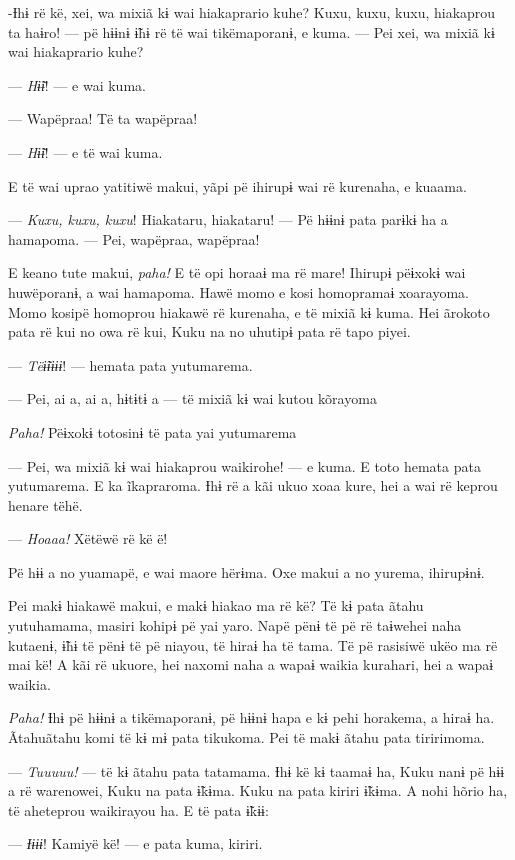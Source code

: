 -Ɨhɨ rë kë, xei, wa mixiã kɨ wai hiakaprario kuhe? Kuxu, kuxu, kuxu,
hiakaprou ta haɨro! --- pë hɨɨnɨ ɨ̃hɨ rë të wai tikëmaporanɨ, e kuma. ---
Pei xei, wa mixiã kɨ wai hiakaprario kuhe?

--- \textit{Hɨ̃ɨ}! --- e wai kuma. 

--- Wapëpraa! Të ta wapëpraa! 

--- \textit{Hɨ̃ɨ}! --- e të wai kuma. 

E të wai uprao yatitiwë makui, yãpi pë ihirupɨ wai rë kurenaha, e
kuaama. 

--- \textit{Kuxu, kuxu, kuxu}! Hiakataru, hiakataru! --- Pë hɨɨnɨ pata parɨkɨ ha a
hamapoma. --- Pei, wapëpraa, wapëpraa! 

E keano tute makui, \textit{paha!} E të opi horaaɨ ma rë mare! Ihirupɨ pëɨxokɨ
wai huwëporanɨ, a wai hamapoma. Hawë momo e kosi homopramaɨ xoarayoma.
Momo kosipë homoprou hiakawë rë kurenaha, e të mixiã kɨ kuma. Hei
ãrokoto pata rë kui no owa rë kui, Kuku na no uhutipɨ pata rë tapo
piyei. 

--- \textit{Tëɨ̃ɨɨɨɨ}! --- hemata pata yutumarema. 

--- Pei, ai a, ai a, hɨtɨtɨ a --- të mixiã kɨ wai kutou kõrayoma 

\textit{Paha!} Pëɨxokɨ totosinɨ të pata yai yutumarema 

--- Pei, wa mixiã kɨ wai hiakaprou waikirohe! --- e kuma. E toto hemata
pata yutumarema. E ka ĩkapraroma. Ɨhɨ rë a kãi ukuo xoaa kure, hei a wai
rë keprou henare tëhë. 

--- \textit{Hoaaa!} Xëtëwë rë kë ë! 

Pë hɨɨ a no yuamapë, e wai maore hërɨma. Oxe makui a no yurema,
ihirupɨnɨ. 

Pei makɨ hiakawë makui, e makɨ hiakao ma rë kë? Të kɨ pata ãtahu
yutuhamama, masiri kohipɨ pë yai yaro. Napë pënɨ të pë rë taɨwehei naha
kutaenɨ, ɨ̃hɨ të pënɨ të pë niayou, të hiraɨ ha të tama. Të pë rasisiwë
ukëo ma rë mai kë! A kãi rë ukuore, hei naxomi naha a wapaɨ waikia
kurahari, hei a wapaɨ waikia. 

\textit{Paha!} Ɨhɨ pë hɨɨnɨ a tikëmaporanɨ, pë hɨɨnɨ hapa e kɨ pehi horakema, a
hiraɨ ha. Ãtahuãtahu komi të kɨ mɨ pata tikukoma. Pei të makɨ ãtahu pata
tiririmoma. 

--- \textit{Tuuuuu!} --- të kɨ ãtahu pata tatamama. Ɨhɨ kë kɨ taamaɨ ha, Kuku nanɨ
pë hɨɨ a rë warenowei, Kuku na pata ɨ̃kɨma. Kuku na pata kiriri ɨ̃kɨma. A nohi hõrio ha, të aheteprou waikirayou ha. E të pata ɨ̃kɨɨ:

--- \textit{Ɨɨɨɨ}! Kamiyë kë! --- e pata kuma, kiriri. 


